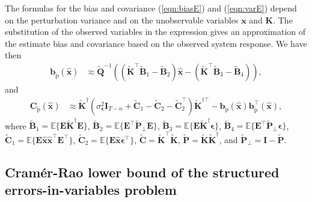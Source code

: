 The formulas for the bias and covariance (\ref{eqn:biasE}) and (\ref{eqn:varE}) depend on the perturbation variance and on the unobservable variables $\mathbf{x}$ and $\mathbf{K}$.
The substitution of the observed variables in the expression gives an approximation of the estimate bias and covariance based on the observed system response.
We have then
\begin{equation} \begin{aligned} \mathbf{b}_{\widetilde{\mathrm{p}}} \left( \widehat{\mathbf{x}} \right) & \approx \widetilde{\mathbf{Q}}^{-1} \left( \left( \widetilde{\mathbf{K}}^\top \widetilde{\mathbf{B}}_1 - \widetilde{\mathbf{B}}_2 \right) \widehat{\mathbf{x}} - \left( \widetilde{\mathbf{K}}^\top \widetilde{\mathbf{B}}_3 - \widetilde{\mathbf{B}}_4 \right) \right), \end{aligned} \label{eqn:biasST} \end{equation}
and
\begin{equation} \begin{aligned} \mathbf{C}_{\widetilde{\mathrm{p}}} \left( \widehat{\mathbf{x}} \right) & \approx \widetilde{\mathbf{K}}^\dagger \left( \sigma_{\bm{\epsilon}}^2 \mathbf{I}_{T-n} + \widetilde{\mathbf{C}}_1 - \widetilde{\mathbf{C}}_2 - \widetilde{\mathbf{C}}_2^\top \right) \widetilde{\mathbf{K}}^{\dagger \top} - \mathbf{b}_{\widetilde{\mathrm{p}}} \left( \widehat{\mathbf{x}} \right) \mathbf{b}_{\widetilde{\mathrm{p}}}^\top \left( \widehat{\mathbf{x}} \right) , \end{aligned} \label{eqn:varST} \end{equation}
where $\widetilde{\mathbf{B}}_1 = \mathbb{E} \Big\{ \mathbf{E} \widetilde{\mathbf{K}}^\dagger \mathbf{E} \Big\}$, $\widetilde{\mathbf{B}}_2 = \mathbb{E} \Big\{ \mathbf{E}^\top \widetilde{\mathbf{P}}_\perp \mathbf{E} \Big\}$, $\widetilde{\mathbf{B}}_3 = \mathbb{E} \Big\{ \mathbf{E} \widetilde{\mathbf{K}}^\dagger \bm{\epsilon} \Big\}$, $\widetilde{\mathbf{B}}_4 = \mathbb{E} \Big\{ \mathbf{E}^\top \widetilde{\mathbf{P}}_\perp \bm{\epsilon} \Big\}$, $\widetilde{\mathbf{C}}_1 = \mathbb{E} \Big\{ \mathbf{E} \widehat{\mathbf{x}} \widehat{\mathbf{x}}^\top \mathbf{E}^\top \Big\}$, $\widetilde{\mathbf{C}}_2 = \mathbb{E} \Big\{ \mathbf{E} \widehat{\mathbf{x}} \bm{\epsilon}^\top \Big\}$, $\widetilde{\mathbf{C}} = \widetilde{\mathbf{K}}^\top \widetilde{\mathbf{K}}$, $\widetilde{\mathbf{P}} = \widetilde{\mathbf{K}} \widetilde{\mathbf{K}}^\dagger$, and $\widetilde{\mathbf{P}}_\perp = \mathbf{I} - \widetilde{\mathbf{P}}$.

\subsection{Cram\'er-Rao lower bound of the structured errors-in-variables problem}


